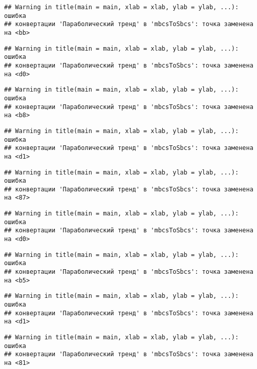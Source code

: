 \documentclass[
]{article}
\begin{document}
\begin{verbatim}
## Warning in title(main = main, xlab = xlab, ylab = ylab, ...): ошибка
## конвертации 'Параболический тренд' в 'mbcsToSbcs': точка заменена на <bb>
\end{verbatim}

\begin{verbatim}
## Warning in title(main = main, xlab = xlab, ylab = ylab, ...): ошибка
## конвертации 'Параболический тренд' в 'mbcsToSbcs': точка заменена на <d0>
\end{verbatim}

\begin{verbatim}
## Warning in title(main = main, xlab = xlab, ylab = ylab, ...): ошибка
## конвертации 'Параболический тренд' в 'mbcsToSbcs': точка заменена на <b8>
\end{verbatim}

\begin{verbatim}
## Warning in title(main = main, xlab = xlab, ylab = ylab, ...): ошибка
## конвертации 'Параболический тренд' в 'mbcsToSbcs': точка заменена на <d1>
\end{verbatim}

\begin{verbatim}
## Warning in title(main = main, xlab = xlab, ylab = ylab, ...): ошибка
## конвертации 'Параболический тренд' в 'mbcsToSbcs': точка заменена на <87>
\end{verbatim}

\begin{verbatim}
## Warning in title(main = main, xlab = xlab, ylab = ylab, ...): ошибка
## конвертации 'Параболический тренд' в 'mbcsToSbcs': точка заменена на <d0>
\end{verbatim}

\begin{verbatim}
## Warning in title(main = main, xlab = xlab, ylab = ylab, ...): ошибка
## конвертации 'Параболический тренд' в 'mbcsToSbcs': точка заменена на <b5>
\end{verbatim}

\begin{verbatim}
## Warning in title(main = main, xlab = xlab, ylab = ylab, ...): ошибка
## конвертации 'Параболический тренд' в 'mbcsToSbcs': точка заменена на <d1>
\end{verbatim}

\begin{verbatim}
## Warning in title(main = main, xlab = xlab, ylab = ylab, ...): ошибка
## конвертации 'Параболический тренд' в 'mbcsToSbcs': точка заменена на <81>
\end{verbatim}
\end{document}
